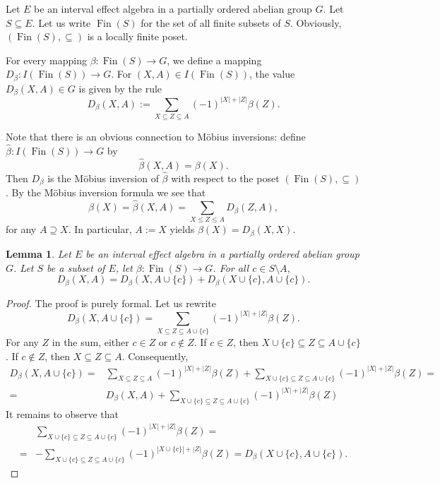 \documentclass[letterpaper]{amsart}
\newtheorem{lemma}{Lemma}
\theoremstyle{definition}
\DeclareMathOperator*\Fin{Fin}
\begin{document}
Let $E$ be an interval effect algebra in a partially ordered abelian group $G$.
Let $S\subseteq E$. Let us write $\Fin(S)$ for the set of all
finite subsets of $S$. Obviously, $(\Fin(S),\subseteq)$ is a locally
finite poset.

For every mapping $\beta:\Fin(S)\to G$, we define a
mapping $D_\beta:I(\Fin(S))\to G$.
For $(X,A)\in I(\Fin(S))$,
the value
$D_\beta(X,A)\in G$ is given by the rule
$$
D_\beta(X,A):=\sum_{X\subseteq Z\subseteq A}(-1)^{|X|+|Z|}\beta(Z).
$$

Note that there is an obvious connection to M\"obius inversions:
define
$\hat\beta:I(\Fin(S))\to G$ by
$$
\hat\beta(X,A)=\beta(X).
$$
Then $D_\beta$ is the M\"obius inversion
of $\hat\beta$ with respect to the poset $(\Fin(S),\subseteq)$.
By the M\"obius inversion formula we see that
\begin{equation}\label{eq:decomp}
\beta(X)=\hat\beta(X,A)=\sum_{X\leq Z\leq A}D_\beta(Z,A),
\end{equation}
for any $A\supseteq X$.
In particular, $A:=X$ yields $\beta(X)=D_\beta(X,X)$.

\begin{lemma}
\label{lemma:formal}
Let $E$ be an interval effect algebra in a partially ordered abelian group $G$.
Let $S$ be a subset of $E$, let $\beta:\Fin(S)\to G$.
For all $c\in S\setminus A$,
$$
D_\beta(X,A)=D_\beta(X,A\cup\{c\})+ D_\beta(X\cup\{c\},A\cup\{c\}).
$$
\end{lemma}
\begin{proof}
The proof is purely formal.
Let us rewrite
$$
D_\beta(X,A\cup\{c\})=\sum_{X\subseteq Z\subseteq A\cup\{c\}}(-1)^{|X|+|Z|}\beta(Z).
$$
For any $Z$ in the sum, either $c\in Z$ or $c\notin Z$.
If $c\in Z$, then $X\cup\{c\}\subseteq Z \subseteq A\cup \{c\}$.
If $c\notin Z$, then $X\subseteq Z\subseteq A$.
Consequently,
\begin{align*}
D_\beta(X,A\cup\{c\})=&\sum_{X\subseteq Z\subseteq A}(-1)^{|X|+|Z|}\beta(Z)+
\sum_{X\cup\{c\}\subseteq Z\subseteq A\cup \{c\}}(-1)^{|X|+|Z|}\beta(Z)=\\
=&D_\beta(X,A)+\sum_{X\cup\{c\}\subseteq Z\subseteq A\cup \{c\}}(-1)^{|X|+|Z|}\beta(Z)
\end{align*}
It remains to observe that
\begin{align*}
~&\sum_{X\cup\{c\}\subseteq Z\subseteq A\cup \{c\}}(-1)^{|X|+|Z|}\beta(Z)=\\
=&-\sum_{X\cup\{c\}\subseteq Z\subseteq A\cup \{c\}}(-1)^{|X\cup\{c\}|+|Z|}\beta(Z)=
D_\beta(X\cup\{c\},A\cup\{c\}).
\end{align*}
\end{proof}
\end{document}
